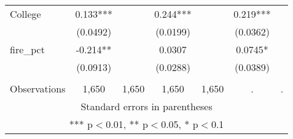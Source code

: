 \begin{tabular}{lcccccc}
College & 0.133*** &  & 0.244*** &  & 0.219*** &  \\
 & (0.0492) &  & (0.0199) &  & (0.0362) &  \\
fire\_pct & -0.214** &  & 0.0307 &  & 0.0745* &  \\
 & (0.0913) &  & (0.0288) &  & (0.0389) &  \\
 &  &  &  &  &  &  \\
 Observations & 1,650 & 1,650 & 1,650 & 1,650 & . & . \\ \hline
\multicolumn{7}{c}{ Standard errors in parentheses} \\
\multicolumn{7}{c}{ *** p$<$0.01, ** p$<$0.05, * p$<$0.1} \\
\end{tabular}
